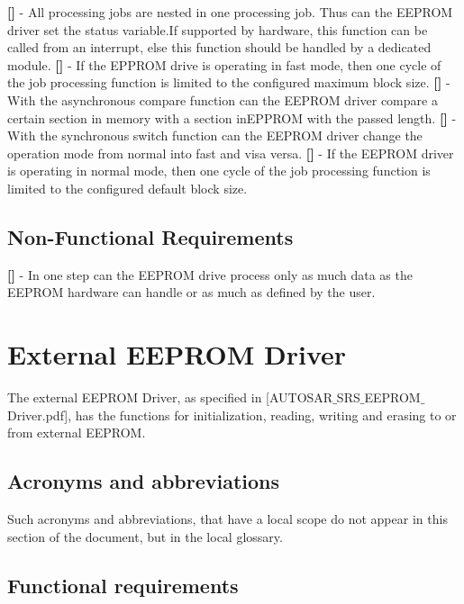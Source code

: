 \newline
{\bf []} - All processing jobs are nested in one processing job. Thus can the \mbox{EEPROM} driver set the status variable.If supported by hardware, this function can be called from an interrupt, else this function should be handled by a dedicated module.\newline
\newline
{\bf []} - If the EPPROM drive is operating in fast mode, then one cycle of the job processing function is limited to the configured maximum block size.\newline
\newline
{\bf []} - With the asynchronous compare function can the EEPROM driver compare a certain section in memory with a section in\mbox{EPPROM} with the passed length.\newline
\newline
{\bf []} - With the synchronous switch function can the EEPROM driver change the operation mode from normal into fast and visa versa.\newline
\newline
{\bf []} - If the EEPROM driver is operating in normal mode, then one cycle of the job processing function is limited to the configured default block size.

\subsection{Non-Functional Requirements}
{\bf []} - In one step can the EEPROM drive process only as much data as the EEPROM hardware can handle or as much as defined by the user.
\newpage

\section{External EEPROM Driver}
The external EEPROM Driver, as specified in  [AUTOSAR$\_$SRS$\_$EEPROM$\_$Driver.pdf], has the functions for initialization, reading, writing and erasing to or from external \mbox{EEPROM}.
\subsection{Acronyms and abbreviations}
Such acronyms and abbreviations, that have a local scope do not appear in this section of the document, but in the local glossary.
\subsection{Functional requirements}

